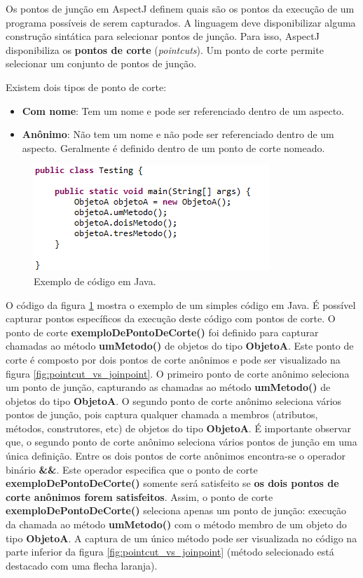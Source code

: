 Os pontos de junção em AspectJ definem quais são os pontos da execução de um programa possíveis de serem capturados. A linguagem deve disponibilizar
alguma construção sintática para selecionar pontos de junção. Para isso, AspectJ disponibiliza os \textbf{pontos de corte} (\textit{pointcuts}). Um
ponto de corte permite selecionar um conjunto de pontos de junção. 

Existem dois tipos de ponto de corte:

\begin{itemize}
  \item \textbf{Com nome}: Tem um nome e pode ser referenciado dentro de um
  aspecto.
  \item \textbf{Anônimo}: Não tem um nome e não pode ser referenciado dentro de
  um aspecto. Geralmente é definido dentro de um ponto de corte nomeado.
\end{itemize}

\begin{figure}[!hb]
	\centering
	\includegraphics{img/pointcut_code.png}
	\caption{Exemplo de código em Java.}\label{fig:pointcut_code}
\end{figure}

O código da figura \ref{fig:pointcut_code} mostra o exemplo de um simples código
em Java. É possível capturar pontos específicos da execução deste código
com pontos de corte. O ponto de corte \textbf{exemploDePontoDeCorte()} foi
definido para capturar chamadas ao método \textbf{umMetodo()} de objetos do tipo \textbf{ObjetoA}. 
Este ponto de corte é composto por dois pontos de corte anônimos e pode ser 
visualizado na figura \ref{fig:pointcut_vs_joinpoint}. O primeiro ponto de corte
anônimo seleciona um ponto de junção, capturando as chamadas ao método \textbf{umMetodo()} de 
objetos do tipo \textbf{ObjetoA}. O segundo ponto de corte anônimo seleciona vários
pontos de junção, pois captura qualquer chamada a membros (atributos, métodos,
construtores, etc) de objetos do tipo \textbf{ObjetoA}. 
É importante observar que, o segundo ponto de corte anônimo seleciona vários
pontos de junção em uma única definição. Entre os dois pontos de corte anônimos 
encontra-se o operador binário \textbf{\&\&}. Este operador especifica que o ponto de corte
\textbf{exemploDePontoDeCorte()} somente será satisfeito se \textbf{os dois
pontos de corte anônimos forem satisfeitos}. Assim, o ponto de corte
\textbf{exemploDePontoDeCorte()} seleciona apenas um ponto de junção: execução da
chamada ao método \textbf{umMetodo()} com o método membro de um objeto do
tipo \textbf{ObjetoA}. A captura de um único método pode ser visualizada no
código na parte inferior da figura \ref{fig:pointcut_vs_joinpoint}
(método selecionado está destacado com uma flecha laranja).

